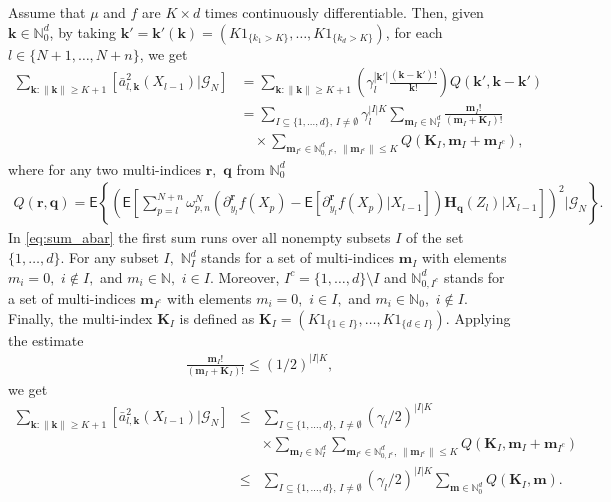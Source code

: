 \documentclass[article]{elsarticle}
\begin{document}
Assume that $\mu$ and $f$ are $K\times d$ times continuously differentiable.
Then, given $\mathbf k\in\mathbb N_0^d$,
by taking $\mathbf k'= \mathbf k'(\mathbf k)
=(K1_{\{k_1>K\}},\ldots,K1_{\{k_d>K\}})$,
for each $l\in\{N+1,\ldots,N+n\}$, we get
\begin{align}
\label{eq:sum_abar}
\sum_{\mathbf{k}\colon\|\mathbf{k}\|\geq K+1}\left[\bar{a}_{l,\mathbf{k}}^{2}(X_{l-1})|\mathcal{G}_{N}\right] & =\sum_{\mathbf{k}\colon\|\mathbf{k}\|\geq K+1}\left(\gamma_{l}^{|\mathbf{k}'|}\frac{(\mathbf{k}-\mathbf{k}')!}{\mathbf{k}!}\right)Q(\mathbf{k}',\mathbf{k}-\mathbf{k}')\\
\nonumber
 & =\sum_{I\subseteq\{1,\ldots,d\},\, I\neq \emptyset}\gamma_{l}^{|I|K}\sum_{\mathbf{m}_{I}\in\mathbb{N}_{I}^{d}}\frac{\mathbf{m}_{I}!}{\left(\mathbf{m}_{I}+\mathbf{K}_{I}\right)!}
 \\
 \nonumber
 & \hspace{1em}\times\sum_{\mathbf{m}_{I^c}\in \mathbb{N}^d_{0,I^c},\,\|\mathbf{m}_{I^c}\|\leq K}Q(\mathbf{\mathbf{K}}_{I},\mathbf{m}_{I}+\mathbf{m}_{I^c}),
\end{align}
where for any two multi-indices \(\mathbf{r},\) \(\mathbf{q}\) from \(\mathbb{N}_0^d\)
\begin{eqnarray*}
Q(\mathbf{r},\mathbf{q})=\mathsf{E}\left\{
\left(\mathsf{E}\left[\sum_{p=l}^{N+n}\omega_{p,n}^{N}\left(\partial_{y_{l}}^{\mathbf r}f\left(X_{p}\right)-\mathsf{E}\left[\partial_{y_{l}}^{\mathbf r}f\left(X_{p}\right)|X_{l-1}\right]\right)\mathbf{H}_{\mathbf{q}}(Z_{l})\Big|X_{l-1}\right]\right)^{2}
\Bigg|\mathcal G_N \right\}.
\end{eqnarray*}
In \eqref{eq:sum_abar} the first sum runs over all nonempty subsets $I$ of the set $\{1,\ldots,d\}.$
For any subset $I,$ $\mathbb{N}_{I}^{d}$ stands for a set
of multi-indices $\mathbf{m}_{I}$ with elements $m_{i}=0,$ $i\not\in I,$
and $m_{i}\in\mathbb{N},$  $i\in I.$ Moreover, \(I^c=\{1,\ldots,d\}\setminus I\) and \(\mathbb{N}^d_{0,I^c}\) stands for a set
of multi-indices $\mathbf{m}_{I^c}$ with elements $m_{i}=0,$ $i\in I,$
and $m_{i}\in\mathbb{N}_0,$  $i\not\in I.$ Finally, the multi-index \(\mathbf{K}_I\) is defined as $\mathbf{\mathbf{K}}_{I}=(K1_{\{1\in I\}},\ldots,K1_{\{d\in I\}}).$
Applying the estimate
\begin{eqnarray*}
\frac{\mathbf{m}_{I}!}{\left(\mathbf{m}_{I}+\mathbf{K}_{I}\right)!}\leq (1/2)^{|I| K},
\end{eqnarray*}
we get
\begin{eqnarray*}
\sum_{\mathbf{k}\colon\|\mathbf{k}\|\geq K+1}\left[\bar{a}_{l,\mathbf{k}}^{2}(X_{l-1})|\mathcal{G}_{N}\right]&\leq &
\sum_{I\subseteq\{1,\ldots,d\},\, I\neq \emptyset} (\gamma_{l}/2)^{|I|K}
\\
&& \times\sum_{\mathbf{m}_{I}\in\mathbb{N}_{I}^{d}} \sum_{\mathbf{m}_{I^c}\in \mathbb{N}^d_{0,I^c},\,\|\mathbf{m}_{I^c}\|\leq K} Q(\mathbf{\mathbf{K}}_{I},\mathbf{m}_{I}+\mathbf{m}_{I^c})
\\
&\leq &
\sum_{I\subseteq\{1,\ldots,d\},\, I\neq \emptyset} (\gamma_{l}/2)^{|I|K} \sum_{\mathbf{m}\in\mathbb{N}_0^{d}} Q(\mathbf{\mathbf{K}}_{I},\mathbf{m}).
\end{eqnarray*}
\end{document}

